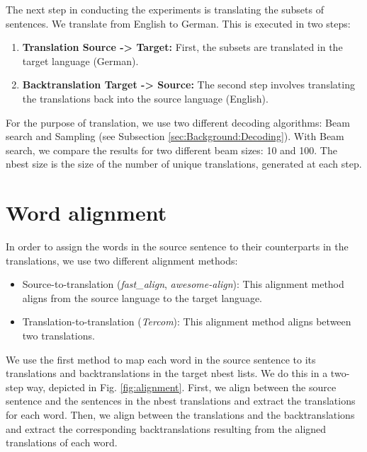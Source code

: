 The next step in conducting the experiments is translating the subsets of sentences. We translate from English to German. This is executed in two steps:

\begin{enumerate}
    \item \textbf{Translation Source -> Target:} 
    First, the subsets are translated in the target language (German).
    \item \textbf{Backtranslation Target -> Source:}
    The second step involves translating the translations back into the source language (English).
\end{enumerate}

For the purpose of  translation, we use two different decoding algorithms: Beam search and Sampling (see Subsection \ref{sec:Background:Decoding}). With Beam search, we compare the results for two different beam sizes: 10 and 100. The nbest size is the size of the number of unique translations, generated at each step. 

\section{Word alignment}
\label{sec:Base_Experiment:Alignment}

In order to assign the words in the source sentence to their counterparts in the translations, we use two different alignment methods:

\begin{itemize}
    \item Source-to-translation (\textit{fast\_align}, \textit{awesome-align}): This alignment method aligns from the source language to the target language.
    \item Translation-to-translation (\textit{Tercom}): This alignment method aligns between two translations.
\end{itemize}

We use the first method to map each word in the source sentence to its translations and backtranslations in the target nbest lists. We do this in a two-step way, depicted in Fig. \ref{fig:alignment}. First, we align between the source sentence and the sentences in the nbest translations and extract the translations for each word. Then, we align between the translations and the backtranslations and extract the corresponding backtranslations resulting from the aligned translations of each word. 

